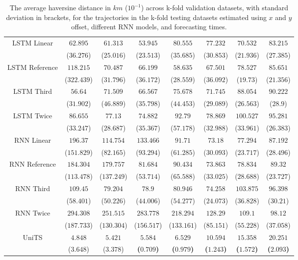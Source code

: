 \begin{table}[!ht]
{\begin{tabular}{|c|c|c|c|c|c|c|c|}
			\multirow{2}{*}{LSTM Linear} & $62.895$ & $61.313$ & $53.945$ & $80.555$ & $77.232$ & $70.532$ & $83.215$ \\
			 & ($36.276$) & ($25.016$) & ($23.513$) & ($35.685$) & ($30.853$) & ($21.936$) & ($27.385$) \\ \hline
			\multirow{2}{*}{LSTM Reference} & $118.215$ & $70.487$ & $66.199$ & $58.635$ & $67.501$ & $78.527$ & $85.651$ \\
			 & ($322.439$) & ($31.796$) & ($36.172$) & ($28.559$) & ($36.092$) & ($19.73$) & ($21.356$) \\ \hline
			\multirow{2}{*}{LSTM Third} & $56.64$ & $71.509$ & $66.567$ & $75.678$ & $71.745$ & $88.054$ & $90.222$ \\
			 & ($31.902$) & ($46.889$) & ($35.798$) & ($44.453$) & ($29.089$) & ($26.563$) & ($28.9$) \\ \hline
			\multirow{2}{*}{LSTM Twice} & $86.655$ & $77.13$ & $74.882$ & $92.79$ & $78.869$ & $100.527$ & $95.281$ \\
			 & ($33.247$) & ($28.687$) & ($35.367$) & ($57.178$) & ($32.988$) & ($33.961$) & ($26.383$) \\ \hline
			\multirow{2}{*}{RNN Linear} & $196.37$ & $114.754$ & $133.466$ & $91.71$ & $73.18$ & $77.294$ & $87.192$ \\
			 & ($151.829$) & ($82.165$) & ($93.294$) & ($61.285$) & ($30.093$) & ($23.717$) & ($28.496$) \\ \hline
			\multirow{2}{*}{RNN Reference} & $184.304$ & $179.757$ & $81.684$ & $90.434$ & $73.863$ & $78.834$ & $89.32$ \\
			 & ($113.478$) & ($137.249$) & ($53.714$) & ($65.588$) & ($33.025$) & ($28.688$) & ($23.727$) \\ \hline
			\multirow{2}{*}{RNN Third} & $109.45$ & $79.204$ & $78.9$ & $80.946$ & $74.258$ & $103.875$ & $96.398$ \\
			 & ($58.401$) & ($50.226$) & ($44.006$) & ($54.277$) & ($24.073$) & ($36.828$) & ($30.21$) \\ \hline
			\multirow{2}{*}{RNN Twice} & $294.308$ & $251.515$ & $283.778$ & $218.294$ & $128.29$ & $109.1$ & $98.12$ \\
			 & ($187.733$) & ($130.304$) & ($156.517$) & ($133.161$) & ($85.151$) & ($55.228$) & ($37.058$) \\ \hline
			\multirow{2}{*}{UniTS} & $4.848$ & $5.421$ & $\mathbf{5.584}$ & $\mathbf{6.529}$ & $\mathbf{10.594}$ & $\mathbf{15.358}$ & $\mathbf{20.251}$ \\
			 & ($3.648$) & ($3.378$) & \textbf{(}$\mathbf{0.709}$\textbf{)} & \textbf{(}$\mathbf{0.979}$\textbf{)} & \textbf{(}$\mathbf{1.243}$\textbf{)} & \textbf{(}$\mathbf{1.572}$\textbf{)} & \textbf{(}$\mathbf{2.093}$\textbf{)} \\ \hline
		\end{tabular}
	}
	\caption{The average haversine distance in $km$ ($10^{-1}$) across k-fold validation datasets, with standard deviation in brackets, for the trajectories in the k-fold testing datasets estimated using $x$ and $y$ offset, different RNN models, and forecasting times.}
	\label{tab:all_no_abs_haversine}
\end{table}